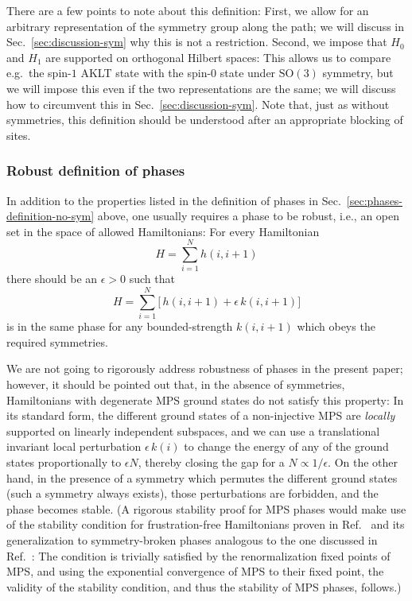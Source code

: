 \documentclass[twocolumn,superscriptaddress,prb,linenumbers]{revtex4-1}
\newcommand{\sss}[1]{\subsubsection{#1}}
\begin{document}
There are a few points to note about this definition: First, we allow for
an arbitrary representation of the symmetry group along the path; we will
discuss in Sec.~\ref{sec:discussion-sym} why this is not a restriction.
Second, we impose that $H_0$ and $H_1$ are supported on orthogonal Hilbert
spaces: This allows us to compare e.g.\ the spin-$1$ AKLT state with the
spin-$0$ state under $\mathrm{SO(3)}$ symmetry, but we will impose this
even if the two representations are the same; we will discuss how to
circumvent this in Sec.~\ref{sec:discussion-sym}.  Note that, just as
without symmetries, this definition should be understood after an
appropriate blocking of sites.




\sss{Robust definition of phases}


In addition to the properties listed in the definition of phases in
Sec.~\ref{sec:phases-definition-no-sym} above, one usually requires a
phase to be robust, i.e., an open set in the space of allowed
Hamiltonians: For every Hamiltonian
\[
    H=\sum_{i=1}^N h(i,i+1)
\]
there should be an $\epsilon>0$ such that
\[
    H=\sum_{i=1}^N \Big[\,h(i,i+1)+\epsilon\, k(i,i+1)\Big]
\]
is in the same phase for any bounded-strength $k(i,i+1)$ which obeys the
required symmetries.

We are not going to rigorously address robustness of phases in the present
paper; however, it should be pointed out that, in the absence of
symmetries, Hamiltonians with degenerate MPS ground states do not satisfy
this property: In its standard form, the different ground states of a
non-injective MPS are \emph{locally} supported on linearly independent
subspaces, and we can use a translational invariant local perturbation
$\epsilon\, k(i)$ to change the energy of any of the ground states
proportionally to $\epsilon N$, thereby closing the gap for a $N\propto
    1/\epsilon$. On the other hand, in the presence of a symmetry which
permutes the different ground states (such a symmetry always exists),
those perturbations are forbidden, and the phase becomes stable. (A
rigorous stability proof for MPS phases would make use of the stability
condition for frustration-free Hamiltonians proven in
Ref.~ and its generalization to
symmetry-broken phases analogous to the one discussed in
Ref.~: The condition is trivially
satisfied by the renormalization fixed points of
MPS,\cite{verstraete:renorm-MPS} and using the exponential convergence of
MPS to their fixed point,\cite{verstraete:renorm-MPS} the validity of the
stability condition, and thus the stability of MPS phases, follows.)
\end{document}
